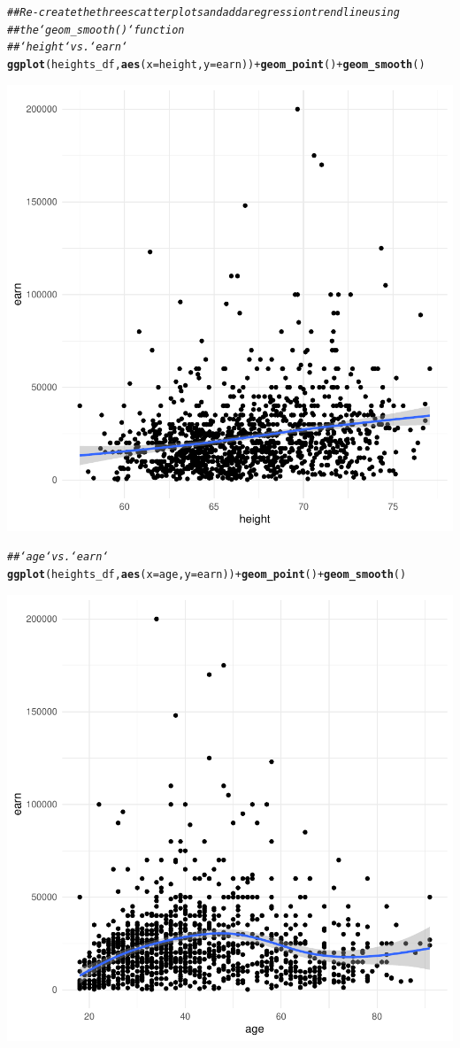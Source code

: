 \documentclass{article}\usepackage[]{graphicx}\usepackage[]{xcolor}
\makeatletter
\newcommand{\hlcom}[1]{\textcolor[rgb]{0.678,0.584,0.686}{\textit{#1}}}%
\newcommand{\hlopt}[1]{\textcolor[rgb]{0,0,0}{#1}}%
\newcommand{\hlstd}[1]{\textcolor[rgb]{0.345,0.345,0.345}{#1}}%
\newcommand{\hlkwc}[1]{\textcolor[rgb]{0.333,0.667,0.333}{#1}}%
\newcommand{\hlkwd}[1]{\textcolor[rgb]{0.737,0.353,0.396}{\textbf{#1}}}%
\newenvironment{kframe}{%
 \def\at@end@of@kframe{}%
 \ifinner\ifhmode%
  \def\at@end@of@kframe{\end{minipage}}%
  \begin{minipage}{\columnwidth}%
 \fi\fi%
 \def\FrameCommand##1{\hskip\@totalleftmargin \hskip-\fboxsep
 \colorbox{shadecolor}{##1}\hskip-\fboxsep
     \hskip-\linewidth \hskip-\@totalleftmargin \hskip\columnwidth}%
 \MakeFramed {\advance\hsize-\width
   \@totalleftmargin\z@ \linewidth\hsize
   \@setminipage}}%
 {\par\unskip\endMakeFramed%
 \at@end@of@kframe}
\newenvironment{knitrout}{}{} %
\makeatother
\begin{document}
\begin{knitrout}
{}


\begin{kframe}\begin{alltt}
\hlcom{## Re-create the three scatterplots and add a regression trend line using}
\hlcom{## the `geom_smooth()` function}
\hlcom{## `height` vs. `earn`}
\hlkwd{ggplot}\hlstd{(heights_df,} \hlkwd{aes}\hlstd{(}\hlkwc{x}\hlstd{=height,} \hlkwc{y}\hlstd{=earn))} \hlopt{+} \hlkwd{geom_point}\hlstd{()} \hlopt{+} \hlkwd{geom_smooth}\hlstd{()}
\end{alltt}


{\ttfamily\noindent\itshape{}}\end{kframe}

{\centering \includegraphics[width=.6\linewidth]{figure/assignment-03-Reppeto-Brian-Rnwauto-report-4} 

}


\begin{kframe}\begin{alltt}
\hlcom{## `age` vs. `earn`}
\hlkwd{ggplot}\hlstd{(heights_df,} \hlkwd{aes}\hlstd{(}\hlkwc{x}\hlstd{=age,} \hlkwc{y}\hlstd{=earn))} \hlopt{+} \hlkwd{geom_point}\hlstd{()} \hlopt{+} \hlkwd{geom_smooth}\hlstd{()}
\end{alltt}


{\ttfamily\noindent\itshape{}}\end{kframe}

{\centering \includegraphics[width=.6\linewidth]{figure/assignment-03-Reppeto-Brian-Rnwauto-report-5} 

}
\end{knitrout}
\end{document}
